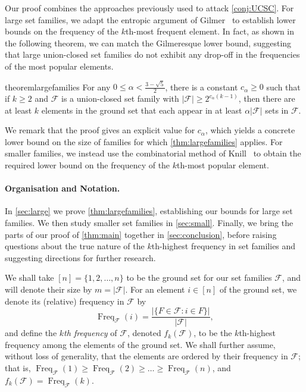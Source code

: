 \documentclass[a4paper,12pt]{article}
\theoremstyle{mystyle}	%
\theoremstyle{definition}
\newcommand{\F}{\mathcal{F}}
\newcommand{\6}{\partial}
\DeclareMathOperator{\Freq}{Freq}
\begin{document}
Our proof combines the approaches previously used to attack \cref{conj:UCSC}. For large set families, we adapt the entropic argument of Gilmer~\cite{gilmer2022constant} to establish lower bounds on the frequency of the $k$th-most frequent element. In fact, as shown in the following theorem, we can match the Gilmeresque lower bound, suggesting that large union-closed set families do not exhibit any drop-off in the frequencies of the most popular elements.
    
\begin{restatable}{theorem}{largefamilies}
\label{thm:largefamilies}
    For any $0\leq \alpha<\frac{3-\sqrt{5}}{2}$, there is a constant $c_\alpha\geq 0$ such that if $k \ge 2$ and $\F$ is a union-closed set family with $|\F| \geq 2^{c_\alpha (k-1)}$, then there are at least $k$ elements in the ground set that each appear in at least $\alpha |\mathcal{F}|$ sets in $\mathcal{F}$.
\end{restatable} 

We remark that the proof gives an explicit value for $c_{\alpha}$, which yields a concrete lower bound on the size of families for which \cref{thm:largefamilies} applies. For smaller families, we instead use the combinatorial method of Knill~\cite{knill1994graph} to obtain the required lower bound on the frequency of the $k$th-most popular element.

\paragraph{Organisation and Notation.}
In \cref{sec:large} we prove \cref{thm:largefamilies}, establishing our bounds for large set families. We then study smaller set families in \cref{sec:small}. Finally, we bring the parts of our proof of \cref{thm:main} together in \cref{sec:conclusion}, before raising questions about the true nature of the $k$th-highest frequency in set families and suggesting directions for further research.

We shall take $[n] = \{1, 2, \hdots, n
\}$ to be the ground set for our set families $\mathcal{F}$, and will denote their size by $m = |\mathcal{F}|$. For an element $i \in [n]$ of the ground set, we denote its (relative) frequency in $\mathcal{F}$ by
\[ \Freq_{\mathcal{F}}(i) = \frac{|\{ F \in \mathcal{F}: i \in F\}|}{|\mathcal{F}|}, \]
and define the \emph{$k$th frequency} of $\mathcal{F}$, denoted $f_k(\mathcal{F})$, to be the $k$th-highest frequency among the elements of the ground set. We shall further assume, without loss of generality, that the elements are ordered by their frequency in $\mathcal{F}$; that is, $\Freq_{\mathcal{F}}(1) \ge \Freq_{\mathcal{F}}(2) \ge \hdots \ge \Freq_{\mathcal{F}}(n)$, and $f_k(\mathcal{F}) = \Freq_{\mathcal{F}}(k)$.
\end{document}
